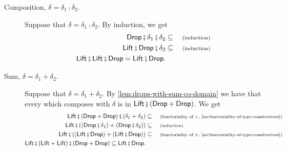 \begin{description} 

\item[Composition, $\delta = \delta_1 \comp \delta_2$.] Suppose that $\delta = \delta_1 \comp \delta_2$. By induction, we get
\begin{align*}
	\Drop \comp \delta_1 \comp \delta_2 &\subseteq \why{induction} \\ 
	\Lift \comp \Drop \comp \delta_2             &\subseteq \why{induction} \\ 
	\Lift \comp \Lift \comp \Drop = \Lift \comp \Drop.
\end{align*}

\item[Sum, $\delta = \delta_1 + \delta_2$.] Suppose that $\delta = \delta_1 + \delta_2$. By \cref{lem:drops-with-sum-co-domain} we have that every  which composes with $\delta$ is in $\Lift \comp (\Drop + \Drop)$. We get
\begin{align*} 
	\Lift \comp (\Drop + \Drop) \comp (\delta_1 + \delta_2) &\subseteq \why{functoriality of $+$, \cref{ax:functoriality-of-type-constructors}} \\ 
	\Lift \comp ((\Drop \comp \delta_1) + (\Drop \comp \delta_2)) &\subseteq \why{induction} \\ 
	\Lift \comp ((\Lift \comp \Drop) + (\Lift \comp \Drop)) &\subseteq \why{functoriality of $+$, \cref{ax:functoriality-of-type-constructors}} \\ 
	\Lift \comp (\Lift + \Lift) \comp (\Drop + \Drop) \subseteq \Lift \comp \Drop.
\end{align*}


\end{description}
